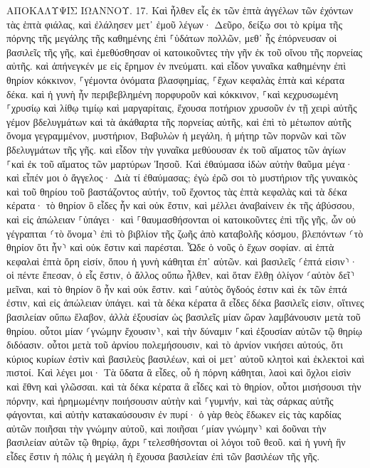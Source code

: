 \documentclass[twoside, 9pt]{extreport}
\begin{document}
ΑΠΟΚΑΛΥΨΙΣ ΙΩΑΝΝΟΥ.
17.
Καὶ ἦλθεν εἷς ἐκ τῶν ἑπτὰ ἀγγέλων τῶν ἐχόντων τὰς ἑπτὰ φιάλας, καὶ ἐλάλησεν μετ᾽ ἐμοῦ λέγων· Δεῦρο, δείξω σοι τὸ κρίμα τῆς πόρνης τῆς μεγάλης τῆς καθημένης ἐπὶ ⸀ὑδάτων πολλῶν, 
μεθ᾽ ἧς ἐπόρνευσαν οἱ βασιλεῖς τῆς γῆς, καὶ ἐμεθύσθησαν οἱ κατοικοῦντες τὴν γῆν ἐκ τοῦ οἴνου τῆς πορνείας αὐτῆς. 
καὶ ἀπήνεγκέν με εἰς ἔρημον ἐν πνεύματι. καὶ εἶδον γυναῖκα καθημένην ἐπὶ θηρίον κόκκινον, ⸀γέμοντα ὀνόματα βλασφημίας, ⸀ἔχων κεφαλὰς ἑπτὰ καὶ κέρατα δέκα. 
καὶ ἡ γυνὴ ἦν περιβεβλημένη πορφυροῦν καὶ κόκκινον, ⸀καὶ κεχρυσωμένη ⸀χρυσίῳ καὶ λίθῳ τιμίῳ καὶ μαργαρίταις, ἔχουσα ποτήριον χρυσοῦν ἐν τῇ χειρὶ αὐτῆς γέμον βδελυγμάτων καὶ τὰ ἀκάθαρτα τῆς πορνείας αὐτῆς, 
καὶ ἐπὶ τὸ μέτωπον αὐτῆς ὄνομα γεγραμμένον, μυστήριον, Βαβυλὼν ἡ μεγάλη, ἡ μήτηρ τῶν πορνῶν καὶ τῶν βδελυγμάτων τῆς γῆς. 
καὶ εἶδον τὴν γυναῖκα μεθύουσαν ἐκ τοῦ αἵματος τῶν ἁγίων ⸀καὶ ἐκ τοῦ αἵματος τῶν μαρτύρων Ἰησοῦ. Καὶ ἐθαύμασα ἰδὼν αὐτὴν θαῦμα μέγα· 
καὶ εἶπέν μοι ὁ ἄγγελος· Διὰ τί ἐθαύμασας; ἐγὼ ἐρῶ σοι τὸ μυστήριον τῆς γυναικὸς καὶ τοῦ θηρίου τοῦ βαστάζοντος αὐτήν, τοῦ ἔχοντος τὰς ἑπτὰ κεφαλὰς καὶ τὰ δέκα κέρατα· 
τὸ θηρίον ὃ εἶδες ἦν καὶ οὐκ ἔστιν, καὶ μέλλει ἀναβαίνειν ἐκ τῆς ἀβύσσου, καὶ εἰς ἀπώλειαν ⸀ὑπάγει· καὶ ⸀θαυμασθήσονται οἱ κατοικοῦντες ἐπὶ τῆς γῆς, ὧν οὐ γέγραπται ⸂τὸ ὄνομα⸃ ἐπὶ τὸ βιβλίον τῆς ζωῆς ἀπὸ καταβολῆς κόσμου, βλεπόντων ⸂τὸ θηρίον ὅτι ἦν⸃ καὶ οὐκ ἔστιν καὶ παρέσται. 
Ὧδε ὁ νοῦς ὁ ἔχων σοφίαν. αἱ ἑπτὰ κεφαλαὶ ἑπτὰ ὄρη εἰσίν, ὅπου ἡ γυνὴ κάθηται ἐπ᾽ αὐτῶν. καὶ βασιλεῖς ⸂ἑπτά εἰσιν⸃· 
οἱ πέντε ἔπεσαν, ὁ εἷς ἔστιν, ὁ ἄλλος οὔπω ἦλθεν, καὶ ὅταν ἔλθῃ ὀλίγον ⸂αὐτὸν δεῖ⸃ μεῖναι, 
καὶ τὸ θηρίον ὃ ἦν καὶ οὐκ ἔστιν. καὶ ⸀αὐτὸς ὄγδοός ἐστιν καὶ ἐκ τῶν ἑπτά ἐστιν, καὶ εἰς ἀπώλειαν ὑπάγει. 
καὶ τὰ δέκα κέρατα ἃ εἶδες δέκα βασιλεῖς εἰσιν, οἵτινες βασιλείαν οὔπω ἔλαβον, ἀλλὰ ἐξουσίαν ὡς βασιλεῖς μίαν ὥραν λαμβάνουσιν μετὰ τοῦ θηρίου. 
οὗτοι μίαν ⸂γνώμην ἔχουσιν⸃, καὶ τὴν δύναμιν ⸀καὶ ἐξουσίαν αὐτῶν τῷ θηρίῳ διδόασιν. 
οὗτοι μετὰ τοῦ ἀρνίου πολεμήσουσιν, καὶ τὸ ἀρνίον νικήσει αὐτούς, ὅτι κύριος κυρίων ἐστὶν καὶ βασιλεὺς βασιλέων, καὶ οἱ μετ᾽ αὐτοῦ κλητοὶ καὶ ἐκλεκτοὶ καὶ πιστοί. 
Καὶ λέγει μοι· Τὰ ὕδατα ἃ εἶδες, οὗ ἡ πόρνη κάθηται, λαοὶ καὶ ὄχλοι εἰσὶν καὶ ἔθνη καὶ γλῶσσαι. 
καὶ τὰ δέκα κέρατα ἃ εἶδες καὶ τὸ θηρίον, οὗτοι μισήσουσι τὴν πόρνην, καὶ ἠρημωμένην ποιήσουσιν αὐτὴν καὶ ⸀γυμνήν, καὶ τὰς σάρκας αὐτῆς φάγονται, καὶ αὐτὴν κατακαύσουσιν ἐν πυρί· 
ὁ γὰρ θεὸς ἔδωκεν εἰς τὰς καρδίας αὐτῶν ποιῆσαι τὴν γνώμην αὐτοῦ, καὶ ποιῆσαι ⸂μίαν γνώμην⸃ καὶ δοῦναι τὴν βασιλείαν αὐτῶν τῷ θηρίῳ, ἄχρι ⸀τελεσθήσονται οἱ λόγοι τοῦ θεοῦ. 
καὶ ἡ γυνὴ ἣν εἶδες ἔστιν ἡ πόλις ἡ μεγάλη ἡ ἔχουσα βασιλείαν ἐπὶ τῶν βασιλέων τῆς γῆς. 
\end{document}
